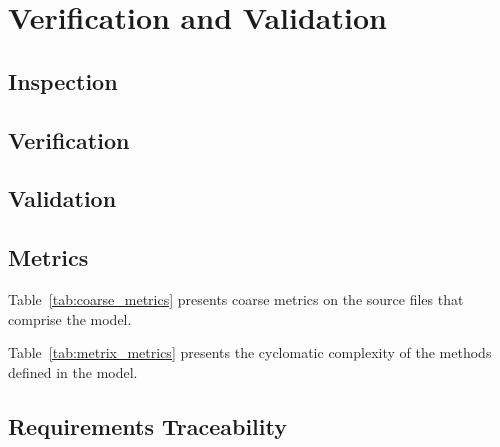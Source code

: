 \chapter{Verification and Validation}\label{ch:ivv}

\section{Inspection}

\section{Verification}

\section{Validation}

\section{Metrics}

Table~\ref{tab:coarse_metrics} presents coarse metrics on the source
files that comprise the model.



Table~\ref{tab:metrix_metrics} presents the cyclomatic complexity of the 
methods defined in the model.



\newpage
\section{Requirements Traceability}

